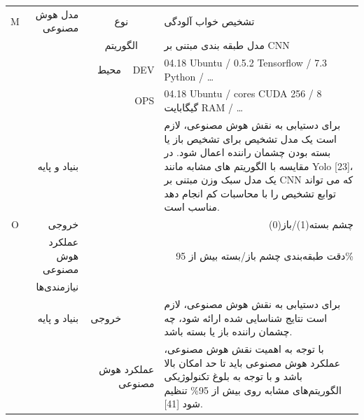 \documentclass[a4paper,10pt]{article}
\begin{document}
\begin{table}[htbp]
\begin{tabularx}{\textwidth}{c c c c X}
                    \multicolumn{1}{c}{M} & \multicolumn{1}{r}{مدل هوش مصنوعی} & \multicolumn{2}{c}{نوع} & تشخیص خواب آلودگی \\
                    &  & \multicolumn{2}{c}{الگوریتم} & مدل طبقه بندی مبتنی بر CNN \\
                    &  & \multicolumn{1}{r}{محیط} & \multicolumn{1}{r}{DEV} & 04.18 Ubuntu / 0.5.2 Tensorflow / 7.3 Python / \dots \\
                    &  &  & \multicolumn{1}{r}{OPS} & 04.18 Ubuntu / cores CUDA 256 / 8 گیگابایت RAM / \dots \\
                    & \multicolumn{1}{r}{بنیاد و پایه} &  &  & برای دستیابی به نقش هوش مصنوعی، لازم است یک مدل تشخیص برای تشخیص باز یا بسته بودن چشمان راننده اعمال شود. در مقایسه با الگوریتم های مشابه مانند Yolo [23]، یک مدل سبک وزن مبتنی بر CNN که می تواند توابع تشخیص را با محاسبات کم انجام دهد مناسب است. \\

                    \multicolumn{1}{c}{O} & \multicolumn{1}{r}{خروجی} & \multicolumn{3}{r}{چشم بسته(1)/باز(0)} \\
                    & \multicolumn{1}{r}{عملکرد هوش مصنوعی} & \multicolumn{3}{r}{دقت طبقه‌بندی چشم باز/بسته بیش از 95\%} \\
                    & \multicolumn{1}{r}{نیازمندی‌ها} &  &  &  \\
                    & \multicolumn{1}{r}{بنیاد و پایه} & \multicolumn{1}{r}{خروجی} &  & برای دستیابی به نقش هوش مصنوعی، لازم است نتایج شناسایی شده ارائه شود، چه چشمان راننده باز یا بسته باشد. \\
                    &  & \multicolumn{2}{r}{عملکرد هوش مصنوعی} & با توجه به اهمیت نقش هوش مصنوعی، عملکرد هوش مصنوعی باید تا حد امکان بالا باشد و با توجه به بلوغ تکنولوژیکی الگوریتم‌های مشابه روی بیش از 95\% تنظیم شود [41]. \\
                    

\end{tabularx}
\end{table}
\end{document}
